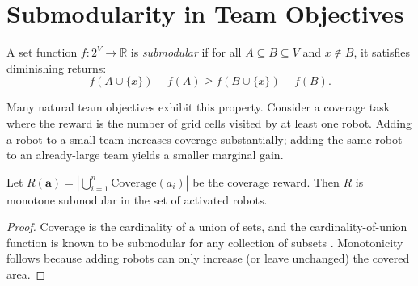 \section{Submodularity in Team Objectives}

A set function $f: 2^V \to \mathbb{R}$ is \emph{submodular} if for all
$A \subseteq B \subseteq V$ and $x \notin B$, it satisfies diminishing returns:
\begin{equation}
  f(A \cup \{x\}) - f(A) \geq f(B \cup \{x\}) - f(B).
  \label{eq:submodular}
\end{equation}

Many natural team objectives exhibit this property. Consider a coverage task
where the reward is the number of grid cells visited by at least one robot.
Adding a robot to a small team increases coverage substantially; adding the
same robot to an already-large team yields a smaller marginal gain.

\begin{proposition}
  Let $R(\mathbf{a}) = |\bigcup_{i=1}^n \text{Coverage}(a_i)|$ be the coverage
  reward. Then $R$ is monotone submodular in the set of activated robots.
\end{proposition}

\begin{proof}
  Coverage is the cardinality of a union of sets, and the cardinality-of-union
  function is known to be submodular for any collection of subsets
  \citep{krause2014submodularity}. Monotonicity follows because adding robots
  can only increase (or leave unchanged) the covered area.
\end{proof}
